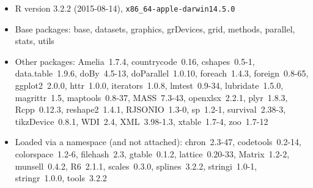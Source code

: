 \begin{itemize}\raggedright
  \item R version 3.2.2 (2015-08-14), \verb|x86_64-apple-darwin14.5.0|
  \item Base packages: base, datasets, graphics, grDevices, grid,
    methods, parallel, stats, utils
  \item Other packages: Amelia~1.7.4, countrycode~0.16, cshapes~0.5-1,
    data.table~1.9.6, doBy~4.5-13, doParallel~1.0.10, foreach~1.4.3,
    foreign~0.8-65, ggplot2~2.0.0, httr~1.0.0, iterators~1.0.8,
    lmtest~0.9-34, lubridate~1.5.0, magrittr~1.5, maptools~0.8-37,
    MASS~7.3-43, openxlsx~2.2.1, plyr~1.8.3, Rcpp~0.12.3,
    reshape2~1.4.1, RJSONIO~1.3-0, sp~1.2-1, survival~2.38-3,
    tikzDevice~0.8.1, WDI~2.4, XML~3.98-1.3, xtable~1.7-4, zoo~1.7-12
  \item Loaded via a namespace (and not attached): chron~2.3-47,
    codetools~0.2-14, colorspace~1.2-6, filehash~2.3, gtable~0.1.2,
    lattice~0.20-33, Matrix~1.2-2, munsell~0.4.2, R6~2.1.1,
    scales~0.3.0, splines~3.2.2, stringi~1.0-1, stringr~1.0.0,
    tools~3.2.2
\end{itemize}

